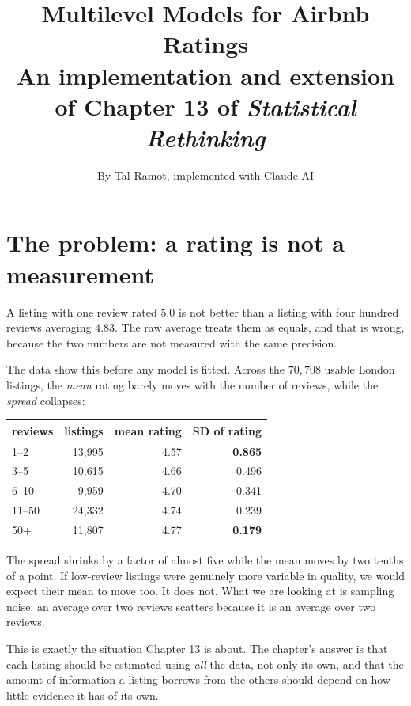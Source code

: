\documentclass[11pt,a4paper]{article}
\title{\textbf{Multilevel Models for Airbnb Ratings}\\[2pt]
       \large An implementation and extension of Chapter 13 of
       \emph{Statistical Rethinking}}
\author{By Tal Ramot, implemented with Claude AI}
\date{}
\begin{document}
\maketitle
\vspace{-2.5em}

\section{The problem: a rating is not a measurement}

A listing with one review rated $5.0$ is not better than a listing with four
hundred reviews averaging $4.83$. The raw average treats them as equals, and
that is wrong, because the two numbers are not measured with the same
precision.

The data show this before any model is fitted. Across the $70{,}708$ usable
London listings, the \emph{mean} rating barely moves with the number of
reviews, while the \emph{spread} collapses:

\begin{center}
\begin{tabular}{lrrr}
\toprule
reviews & listings & mean rating & SD of rating \\
\midrule
1--2   & 13{,}995 & 4.57 & \textbf{0.865} \\
3--5   & 10{,}615 & 4.66 & 0.496 \\
6--10  &  9{,}959 & 4.70 & 0.341 \\
11--50 & 24{,}332 & 4.74 & 0.239 \\
50+    & 11{,}807 & 4.77 & \textbf{0.179} \\
\bottomrule
\end{tabular}
\end{center}

The spread shrinks by a factor of almost five while the mean moves by two
tenths of a point. If low-review listings were genuinely more variable in
quality, we would expect their mean to move too. It does not. What we are
looking at is sampling noise: an average over two reviews scatters because it
is an average over two reviews.

This is exactly the situation Chapter 13 is about. The chapter's answer is that
each listing should be estimated using \emph{all} the data, not only its own,
and that the amount of information a listing borrows from the others should
depend on how little evidence it has of its own.
\end{document}
